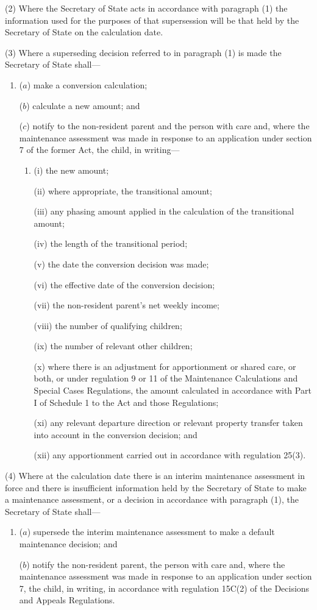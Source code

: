 \documentclass[12pt,a4paper]{article}
\begin{document}
(2) Where the Secretary of State acts in accordance with paragraph (1) the information used for the purposes of that supersession will be that held by the Secretary of State on the calculation date.

(3) Where a superseding decision referred to in paragraph (1) is made the Secretary of State shall—
\begin{enumerate}\item[]
($a$) make a conversion calculation;

($b$) calculate a new amount; and

($c$) notify to the non-resident parent and the person with care and, where the maintenance assessment was made in response to an application under section 7 of the former Act, the child, in writing—
\begin{enumerate}\item[]
(i) the new amount;

(ii) where appropriate, the transitional amount;

(iii)  any phasing amount applied in the calculation of the transitional amount;

(iv) the length of the transitional period;

(v) the date the conversion decision was made;

(vi) the effective date of the conversion decision;

(vii) the non-resident parent’s net weekly income;

(viii) the number of qualifying children;

(ix) the number of relevant other children;

(x) where there is an adjustment for apportionment or shared care, or both, or under regulation 9 or 11 of the Maintenance Calculations and Special Cases Regulations, the amount calculated in accordance with Part I of Schedule 1 to the Act and those Regulations;

(xi) any relevant departure direction or relevant property transfer taken into account in the conversion decision; and

(xii) any apportionment carried out in accordance with regulation 25(3).
\end{enumerate}
\end{enumerate}

(4) Where at the calculation date there is an interim maintenance assessment in force and there is insufficient information held by the Secretary of State to make a maintenance assessment, or a decision in accordance with paragraph (1), the Secretary of State shall—
\begin{enumerate}\item[]
($a$) supersede the interim maintenance assessment to make a default maintenance decision; and

($b$) notify the non-resident parent, the person with care and, where the maintenance assessment was made in response to an application under section 7, the child, in writing, in accordance with regulation 15C(2) of the Decisions and Appeals Regulations.
\end{enumerate}
\end{document}
